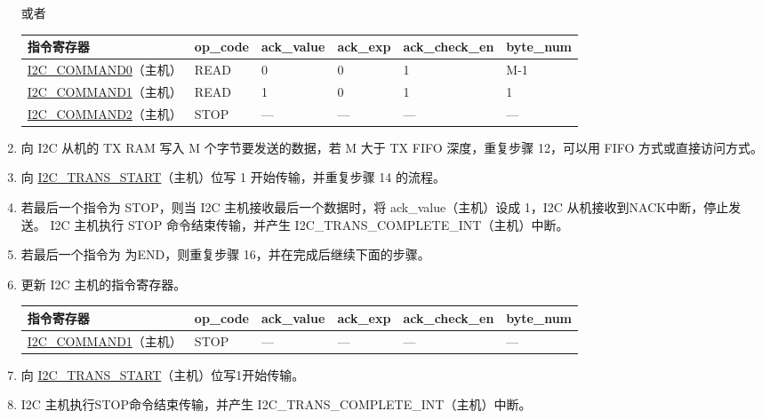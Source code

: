 \documentclass[main\_\_CN.tex]{subfiles}
\begin{document}
\begin{enumerate}
或者

\begin{longtable}{ | p{4cm} | p{2cm} | p{2cm} | p{2cm} |p{2cm} | p{2cm} |}
\hline\rowcolor{lightgray}
指令寄存器& op\_code & ack\_value&ack\_exp&ack\_check\_en&byte\_num  \\ \hline
\hyperref[fielddesc:I2CCOMMAND0]{I2C\_COMMAND0}（主机）& READ& 0&0&1&M-1  \\ \hline
\hyperref[fielddesc:I2CCOMMAND1]{I2C\_COMMAND1}（主机）& READ& 1&0&1&1  \\ \hline
\hyperref[fielddesc:I2CCOMMAND2]{I2C\_COMMAND2}（主机）& STOP& ---&---&---&---  \\ \hline
\end{longtable} 

\item 向 I2C 从机的 TX RAM 写入 M 个字节要发送的数据，若 M 大于 TX FIFO 深度，重复步骤 12，可以用 FIFO 方式或直接访问方式。
\item 向 \hyperref[fielddesc:I2CTRANSSTART]{I2C\_TRANS\_START}（主机）位写 1 开始传输，并重复步骤 14 的流程。
\item 若最后一个指令为 STOP，则当 I2C 主机接收最后一个数据时，将 ack\_value（主机）设成 1，I2C 从机接收到NACK中断，停止发送。 I2C 主机执行 STOP 命令结束传输，并产生 I2C\_TRANS\_COMPLETE\_INT（主机）中断。
\item 若最后一个指令为 为END，则重复步骤 16，并在完成后继续下面的步骤。
\item 更新 I2C 主机的指令寄存器。
\begin{longtable}{ | p{4cm} | p{2cm} | p{2cm} | p{2cm} |p{2cm} | p{2cm} |}
\hline\rowcolor{lightgray}
指令寄存器& op\_code & ack\_value&ack\_exp&ack\_check\_en&byte\_num  \\ \hline
\hyperref[fielddesc:I2CCOMMAND1]{I2C\_COMMAND1}（主机）& STOP& ---&---&---&---  \\ \hline
\end{longtable} 
\item 向 \hyperref[fielddesc:I2CTRANSSTART]{I2C\_TRANS\_START}（主机）位写1开始传输。
\item I2C 主机执行STOP命令结束传输，并产生 I2C\_TRANS\_COMPLETE\_INT（主机）中断。

\end{enumerate}
\end{document}
